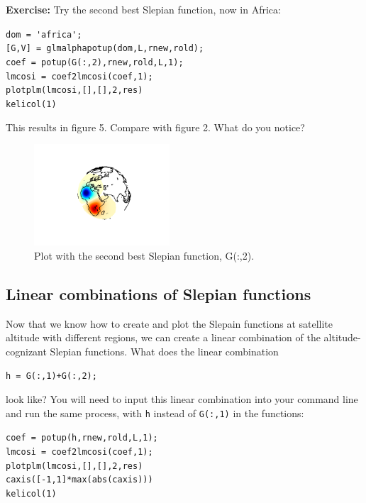 \documentclass[11pt]{article}
\begin{document}
\textbf{Exercise:} Try the second best Slepian function, now in Africa:

\verb+dom = 'africa';+\\
\verb+[G,V] = glmalphapotup(dom,L,rnew,rold);+\\
\verb+coef = potup(G(:,2),rnew,rold,L,1);+\\
\verb+lmcosi = coef2lmcosi(coef,1);+\\
\verb+plotplm(lmcosi,[],[],2,res)+\\
\verb+kelicol(1)+

This results in figure 5.  Compare with figure 2.  What do you notice?

\begin{figure}[H]
  \centering
  \includegraphics[width=0.45\textwidth]{figures/G(:,2)ml.png}
  \caption{Plot with the second best Slepian function, G(:,2).}
\label{G(:,2)}
\end{figure}

\subsection{Linear combinations of Slepian functions}

Now that we know how to create and plot the Slepain functions at satellite altitude with different regions, we can create a linear combination of the altitude-cognizant Slepian functions.  What does the linear combination 

\verb|h = G(:,1)+G(:,2);| 

look like?  You will need to input this linear combination into your command line and run the same process, with \verb+h+ instead of \verb+G(:,1)+ in the functions:

\verb+coef = potup(h,rnew,rold,L,1);+\\
\verb+lmcosi = coef2lmcosi(coef,1);+\\
\verb+plotplm(lmcosi,[],[],2,res)+\\
\verb+caxis([-1,1]*max(abs(caxis)))+\\
\verb+kelicol(1)+
\end{document}
